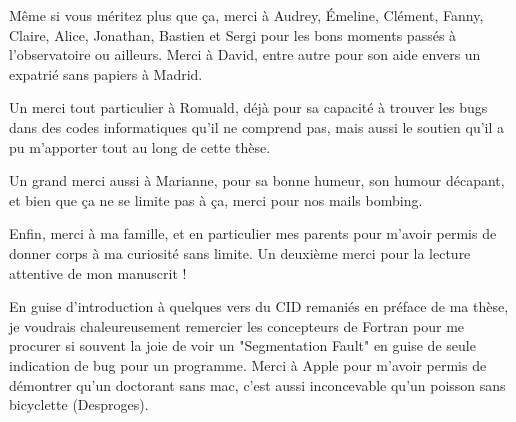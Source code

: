 \bigskip

Même si vous méritez plus que ça, merci à Audrey, Émeline, Clément, Fanny, Claire,
Alice, Jonathan, Bastien et
Sergi pour les bons moments passés à l'observatoire ou ailleurs. Merci à David, entre autre pour son aide envers un expatrié sans papiers à Madrid.

Un merci tout particulier à Romuald, déjà pour sa capacité à trouver les bugs dans des codes informatiques qu'il ne comprend
pas, mais aussi le soutien qu'il a pu m'apporter tout au long de cette thèse. 

Un grand merci aussi à Marianne, pour sa bonne humeur, son humour décapant, et bien que ça ne se limite pas à ça, merci pour nos
mails bombing. 

Enfin, merci à ma famille, et en particulier mes parents pour m'avoir permis de donner corps à ma curiosité sans limite. Un deuxième merci pour la lecture attentive de mon manuscrit !

En guise d'introduction à quelques vers du CID remaniés en préface de ma thèse, je voudrais chaleureusement remercier les
concepteurs de Fortran pour me procurer si souvent la joie de voir un "Segmentation Fault" en guise de seule indication de bug
pour un programme. Merci à Apple pour m'avoir permis de démontrer qu'un doctorant sans mac, c'est aussi inconcevable qu'un
poisson sans bicyclette (\textcopyright Desproges). 


